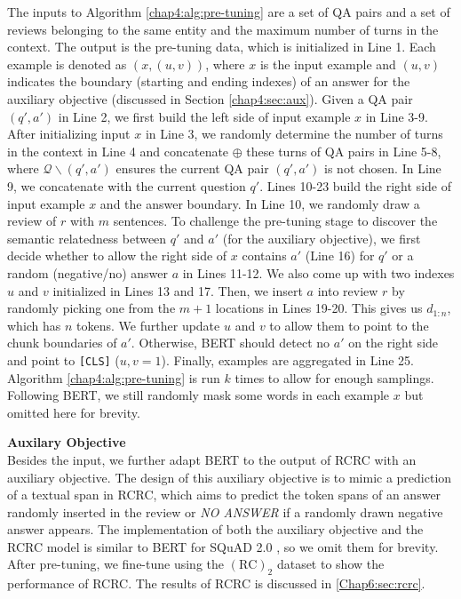 The inputs to Algorithm \ref{chap4:alg:pre-tuning} are a set of QA pairs and a set of reviews belonging to the same entity and the maximum number of turns in the context. The output is the pre-tuning data, which is initialized in Line 1. 
Each example is denoted as $(x, (u, v))$, where $x$ is the input example and $(u, v)$ indicates the boundary (starting and ending indexes) of an answer for the auxiliary objective (discussed in Section \ref{chap4:sec:aux}).
Given a QA pair $(q', a')$ in Line 2, we first build the left side of input example $x$ in Line 3-9.
After initializing input $x$ in Line 3, we randomly determine the number of turns in the context in Line 4 and concatenate $\oplus$ these turns of QA pairs in Line 5-8, where $\mathcal{Q}\backslash(q', a')$ ensures the current QA pair $(q', a')$ is not chosen.
In Line 9, we concatenate with the current question $q'$.
Lines 10-23 build the right side of input example $x$ and the answer boundary.
In Line 10, we randomly draw a review of $r$ with $m$ sentences. To challenge the pre-tuning stage to discover the semantic relatedness between $q'$ and $a'$ (for the auxiliary objective), we first decide whether to allow the right side of $x$ contains $a'$ (Line 16) for $q'$ or a random (negative/no) answer $a$ in Lines 11-12.
We also come up with two indexes $u$ and $v$ initialized in Lines 13 and 17.
Then, we insert $a$ into review $r$ by randomly picking one from the $m+1$ locations in Lines 19-20.
This gives us $d_{1:n}$, which has $n$ tokens. 
We further update $u$ and $v$ to allow them to point to the chunk boundaries of $a'$.
Otherwise, BERT should detect no $a'$ on the right side and point to \texttt{[CLS]} ($u,v=1$). Finally, examples are aggregated in Line 25.
Algorithm \ref{chap4:alg:pre-tuning} is run $k$ times to allow for enough samplings. 
Following BERT, we still randomly mask some words in each example $x$ but omitted here for brevity.

\textbf{Auxilary Objective}\\
\label{chap4:sec:aux}
Besides the input, we further adapt BERT to the output of RCRC with an auxiliary objective.
The design of this auxiliary objective is to mimic a prediction of a textual span in RCRC, which aims to predict the token spans of an answer randomly inserted in the review or \textit{NO ANSWER} if a randomly drawn negative answer appears.
The implementation of both the auxiliary objective and the RCRC model is similar to BERT for SQuAD 2.0 \cite{rajpurkar2018know}, so we omit them for brevity.
After pre-tuning, we fine-tune using the $(\text{RC})_2$ dataset to show the performance of RCRC.
The results of RCRC is discussed in \ref{Chap6:sec:rcrc}.



